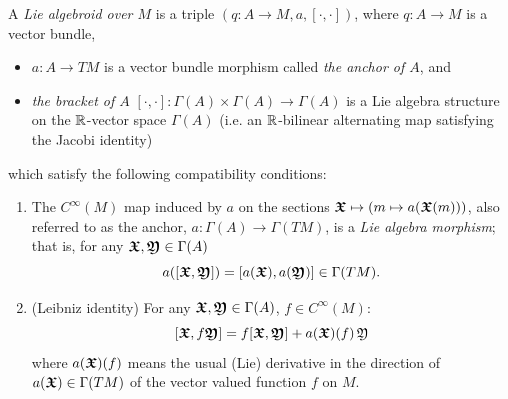 \begin{definition} \label{defnLieAlgoid}
A \emph{Lie algebroid over $M$} is a triple $(q:A \to M, a, [\cdot, \cdot ])$, where $q:A \to M$ is a vector bundle, 
    \begin{itemize}
    
    \item $a:A \to TM$ is a vector bundle morphism called \emph{the anchor of $A$}, and
    
    \item \emph{the bracket of $A$} $[\cdot, \cdot ]: \Gamma(A) \times \Gamma(A) \to \Gamma(A)$ is a Lie algebra structure on the $\mathbb{R}$-vector space $\Gamma(A)$ (i.e. an $\mathbb{R}$-bilinear alternating map satisfying the Jacobi identity)
    
    \end{itemize}  
which satisfy the following compatibility conditions:
    \begin{enumerate}
    
    \item The $C^\infty(M)$ map induced by $a$ on the sections $\bm{\mathfrak{X}} \mapsto (m \mapsto a(\bm{\mathfrak{X}}(m)))$, also referred to as the anchor, $a:\Gamma(A) \to \Gamma(TM)$, is a \emph{Lie algebra morphism}; that is, for any $\bm{\mathfrak{X}}, \bm{\mathfrak{Y}} \in \Gamma(A)$ \[ a([\bm{\mathfrak{X}}, \bm{\mathfrak{Y}}])  = [a(\bm{\mathfrak{X}}), a(\bm{\mathfrak{Y}})] \in  \Gamma(TM).\]
    
    \item (Leibniz identity) For any $\bm{\mathfrak{X}}, \bm{\mathfrak{Y}} \in \Gamma(A)$, $f \in C^\infty (M)$: \[ [\bm{\mathfrak{X}}, f\bm{\mathfrak{Y}}] = f[\bm{\mathfrak{X}}, \bm{\mathfrak{Y}}] + a(\bm{\mathfrak{X}})(f)\, \mathfrak{Y} \] where $a(\bm{\mathfrak{X}})(f)$ means the usual (Lie) derivative in the direction of $a(\bm{\mathfrak{X}}) \in \Gamma(TM)$ of the vector valued function $f$ on $M$.
    
    \end{enumerate}
\end{definition}



